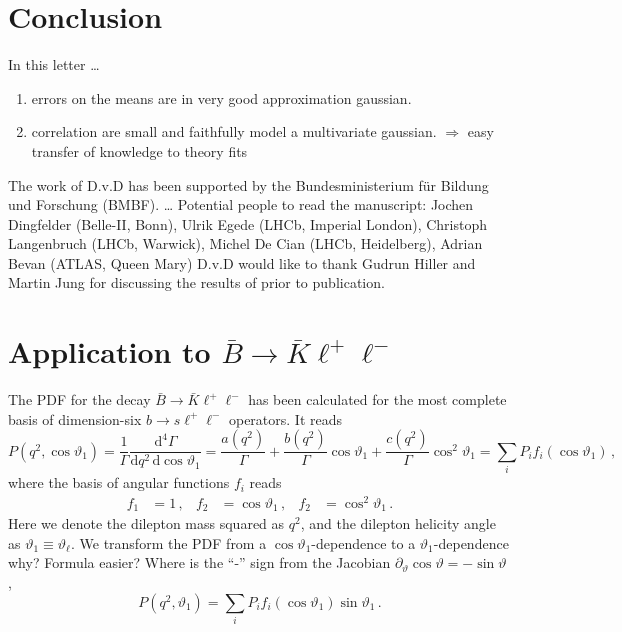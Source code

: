 \documentclass[aps,prd,reprint,nofootinbib,preprintnumbers]{revtex4}
\newcommand{\dd}{\text{d}}
\renewcommand{\theta}{\vartheta}
\newcommand{\danny}[1]{{\color{purple}#1}}
\newcommand{\fred}[1]{{\color{brown!85!black}#1}}
\begin{document}
\section{Conclusion}

In this letter \dots
\begin{enumerate}
    \item errors on the means are in very good approximation gaussian.
    \item correlation are small and faithfully model a multivariate gaussian. \fred{$\Rightarrow$ easy transfer of knowledge to theory fits}
\end{enumerate}


\acknowledgments

The work of D.v.D has been supported by the Bundesministerium f\"ur Bildung und Forschung (BMBF).
\dots
\danny{Potential people to read the manuscript: Jochen Dingfelder (Belle-II, Bonn), Ulrik Egede (LHCb, Imperial London), Christoph Langenbruch (LHCb, Warwick), Michel De Cian (LHCb, Heidelberg), Adrian Bevan (ATLAS, Queen Mary)  }
D.v.D would like to thank Gudrun Hiller and Martin Jung for discussing the results of \cite{Das:2014xx} prior to publication.

\appendix

\section{Application to $\bar{B}\to\bar{K}\ell^+\ell^-$}
\label{app:btokll}

The PDF for the decay $\bar{B}\to\bar{K}\ell^+\ell^-$ has been calculated for the most
complete basis of dimension-six $b\to s \ell^+\ell^-$ operators. It reads \cite{Bobeth:2007dw,Bobeth:2012vn}
\begin{equation}
    P(q^2, \cos\theta_1) = \frac{1}{\Gamma} \frac{\dd^4\Gamma}{\dd q^2\,\dd \cos\theta_1} = \frac{a(q^2)}{\Gamma} + \frac{b(q^2)}{\Gamma} \cos\theta_1 + \frac{c(q^2)}{\Gamma} \cos^2\theta_1 = \sum_i P_i f_i(\cos\theta_1)\,,
\end{equation}
where the basis of angular functions $f_i$ reads
\begin{equation}
\begin{aligned}
    f_1 & = 1\,, &
    f_2 & = \cos\theta_1\,, &
    f_2 & = \cos^2\theta_1\,.
\end{aligned}
\end{equation}
Here we denote the dilepton mass squared as $q^2$, and the dilepton helicity angle as $\theta_1 \equiv \theta_{\ell}$. We transform the PDF from a $\cos\theta_1$-dependence
to a $\theta_1$-dependence \fred{why? Formula easier? Where is the ``-'' sign from the Jacobian $\partial_{\theta} \cos \theta = - \sin \theta$ },
\begin{equation}
    P(q^2, \theta_1) = \sum_i P_i f_i(\cos\theta_1) \sin \theta_1\,.
\end{equation}
\end{document}
